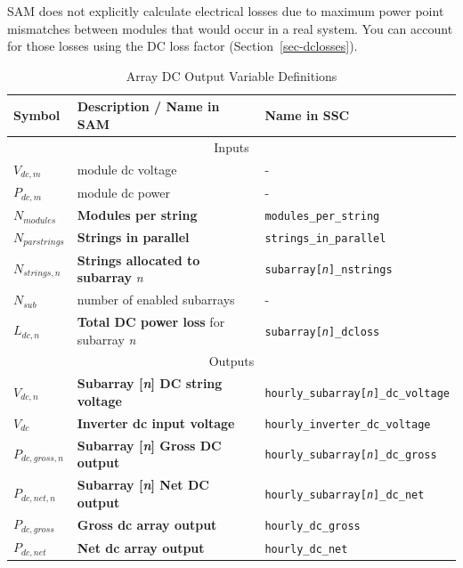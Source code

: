 \documentclass[12pt,letterpaper]{article}
\begin{document}
SAM does not explicitly calculate electrical losses due to maximum power point mismatches between modules that would occur in a real system. You can account for those losses using the DC loss factor (Section~\ref{sec-dclosses}).

\begin{table}
\begin{center}
\caption{Array DC Output Variable Definitions}
\begin{tabular}{lll}
\midrule
Symbol & Description / \textbf{Name in SAM} & Name in SSC \\
\midrule
\multicolumn{3}{c}{Inputs}\\
$V_{dc,m}$ & module dc voltage & - \\
$P_{dc,m}$ & module dc power & - \\
$N_{modules}$ & \textbf{Modules per string} & \texttt{modules\_per\_string} \\
$N_{parstrings}$ & \textbf{Strings in parallel} & \texttt{strings\_in\_parallel} \\
$N_{strings,n}$ & \textbf{Strings allocated to subarray} \textit{n} & \texttt{subarray[\textit{n}]\_nstrings} \\
$N_{sub}$ & number of enabled subarrays & - \\
$L_{dc,n}$ & \textbf{Total DC power loss} for subarray \textit{n} &  \texttt{subarray[\textit{n}]\_dcloss} \\
\midrule
\multicolumn{3}{c}{Outputs}\\
$V_{dc,n}$ & \textbf{Subarray [\textit{n}] DC string voltage} & \texttt{hourly\_subarray[\textit{n}]\_dc\_voltage} \\
$V_{dc}$ & \textbf{Inverter dc input voltage} & \texttt{hourly\_inverter\_dc\_voltage} \\
$P_{dc,gross,n}$ & \textbf{Subarray [\textit{n}] Gross DC output} &  \texttt{hourly\_subarray[\textit{n}]\_dc\_gross} \\
$P_{dc,net,n}$ & \textbf{Subarray [\textit{n}] Net DC output} &  \texttt{hourly\_subarray[\textit{n}]\_dc\_net} \\
$P_{dc,gross}$ & \textbf{Gross dc array output} & \texttt{hourly\_dc\_gross} \\
$P_{dc,net}$ & \textbf{Net dc array output} & \texttt{hourly\_dc\_net} \\
\hline
\end{tabular}
\label{tab-arraydcoutputvars}
\end{center}
\end{table}
\end{document}
